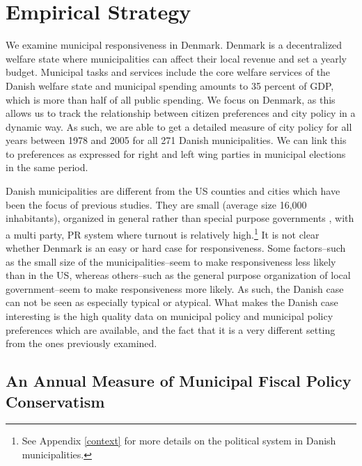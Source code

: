 \documentclass[a4paper,12pt]{article}
\begin{document}


\section*{Empirical Strategy}

 We examine municipal responsiveness in Denmark. Denmark is a decentralized welfare state where municipalities can affect their local revenue and set a yearly budget.  Municipal tasks and services include the core welfare services of the Danish welfare state and municipal spending amounts to 35 percent of GDP, which is more than half of all public spending. We focus on Denmark, as this allows us to track the relationship between citizen preferences and city policy in a dynamic way. As such, we are able to get a detailed measure of city policy for all years between 1978 and 2005 for all 271 Danish municipalities.  We can link this to preferences as expressed for right and left wing parties in municipal elections in the same period.
 
 

Danish municipalities are different from the US counties and cities which have been the focus of previous studies. They are small (average size 16,000 inhabitants), organized in general rather than special purpose governments \citep{berry2009imperfect}, with a multi party, PR system where turnout is relatively high.\footnote{See Appendix \ref{context} for more details on the political system in Danish municipalities.} It is not clear whether Denmark is an easy or hard case for responsiveness.  Some factors--such as the small size of the municipalities--seem to make responsiveness less likely than in the US, whereas others--such as the general purpose organization of local government--seem to make responsiveness more likely. As such, the Danish case can not be seen as especially typical or atypical. What makes the Danish case interesting is the high quality data on municipal policy and municipal policy preferences which are available, and the fact that it is a very different setting from the ones previously examined.


\subsection*{An Annual Measure of Municipal Fiscal Policy Conservatism}
\end{document}
